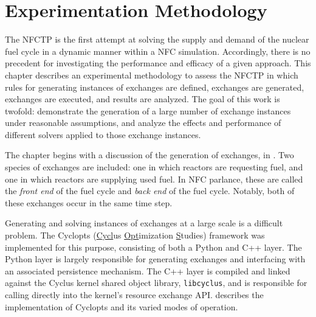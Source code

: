 \chapter{Experimentation Methodology}\label{ch:method}

The NFCTP is the first attempt at solving the supply and demand of the nuclear
fuel cycle in a dynamic manner within a NFC simulation. Accordingly, there is no
precedent for investigating the performance and efficacy of a given
approach. This chapter describes an experimental methodology to assess the NFCTP
in which rules for generating instances of exchanges are defined, exchanges are
generated, exchanges are executed, and results are analyzed. The goal of this
work is twofold: demonstrate the generation of a large number of exchange
instances under reasonable assumptions, and analyze the effects and performance
of different solvers applied to those exchange instances.

The chapter begins with a discussion of the generation of exchanges, in 
. Two species of exchanges are included: one in which reactors
are requesting fuel, and one in which reactors are supplying used fuel. In NFC
parlance, these are called the \textit{front end} of the fuel cycle and
\textit{back end} of the fuel cycle. Notably, both of these exchanges occur
in the same time step. 

Generating and solving instances of exchanges at a large scale is a difficult
problem. The Cyclopts (\underline{Cycl}us \underline{Opt}imization
\underline{S}tudies) framework was implemented for this purpose, consisting of
both a Python and C++ layer. The Python layer is largely responsible for
generating exchanges and interfacing with an associated persistence
mechanism. The C++ layer is compiled and linked against the Cyclus kernel shared
object library, \texttt{libcyclus}, and is responsible for calling directly into
the kernel's resource exchange API.  describes the
implementation of Cyclopts and its varied modes of operation.




